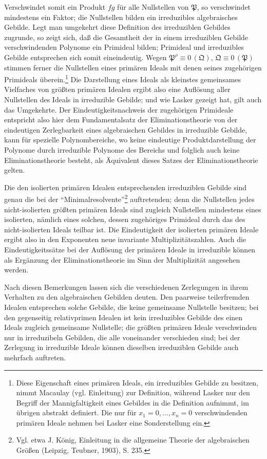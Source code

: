 \documentclass[11pt]{article}
\newcommand{\ideal}[1]{\mathfrak{#1}}
\newcommand{\eqzero}[1]{\equiv 0\,(#1)}
\begin{document}
Verschwindet somit ein Produkt $fg$ für alle Nullstellen von $\ideal P$, so verschwindet mindestens ein Faktor; die Nullstellen bilden ein irreduzibles algebraisches Gebilde. Legt man umgekehrt diese Definition des irreduziblen Gebildes zugrunde, so zeigt sich, daß die Gesamtheit der in einem irreduziblen Gebilde verschwindenden Polynome ein Primideal bilden; Primideal und irreduzibles Gebilde entsprechen sich somit eineindeutig. Wegen $\ideal P^\rho\eqzero{\ideal Q}$, $\ideal Q\eqzero{\ideal P}$ stimmen ferner die Nullstellen eines primären Ideals mit denen seines zugehörigen Primideals überein.\footnote{Diese Eigenschaft eines primären Ideals, ein irreduzibles Gebilde zu besitzen, nimmt Macaulay (vgl. Einleitung) zur Definition, während Lasker nur den Begriff der Mannigfaltigkeit eines Gebildes in die Definition aufnimmt, im übrigen abstrakt definiert. Die nur für $x_1=0,
\ldots,x_n=0$ verschwindenden primären Ideale nehmen bei Lasker eine Sonderstellung ein.} Die Darstellung eines Ideals als kleinstes gemeinsames Vielfaches von größten primären Idealen ergibt also eine Auflösung aller Nullstellen des Ideals in irreduzible Gebilde; und wie Lasker gezeigt hat, gilt auch das Umgekehrte. Der Eindeutigkeitsnachweis der zugehörigen Primideale entspricht also hier dem Fundamentalsatz der Eliminationstheorie von der eindeutigen Zerlegbarkeit eines algebraischen Gebildes in irreduzible Gebilde, kann für spezielle Polynombereiche, wo keine eindeutige Produktdarstellung der Polynome durch irreduzible Polynome des Bereichs und folglich auch keine Eliminationstheorie besteht, als Äquivalent dieses Satzes der Eliminationstheorie gelten.

Die den isolierten primären Idealen entsprechenden irreduziblen Gebilde sind genau die bei der ``Minimalresolvente''\footnote{Vgl. etwa J. König, Einleitung in die allgemeine Theorie der algebraischen Größen (Leipzig, Teubner, 1903), S. 235.} auftretenden; denn die Nullstellen jedes nicht-isolierten größten primären Ideals sind zugleich Nullstellen mindestens eines isolierten, nämlich eines solchen, dessen zugehöriges Primideal durch das des nicht-isolierten Ideals teilbar ist. Die Eindeutigkeit der isolierten primären Ideale ergibt also in den Exponenten neue invariante Multiplizitätszahlen. Auch die Eindeutigkeitssätze bei der Auflösung der primären Ideale in irreduzible können als Ergänzung der Eliminationstheorie im Sinn der Multiplizität angesehen werden.

Nach diesen Bemerkungen lassen sich die verschiedenen Zerlegungen in ihrem Verhalten zu den algebraischen Gebilden deuten. Den paarweise teilerfremden Idealen entsprechen solche Gebilde, die keine gemeinsame Nullstelle besitzen; bei den gegenseitig relativprimen Idealen ist kein irreduzibles Gebilde des einen Ideals zugleich gemeinsame Nullstelle; die größten primären Ideale verschwinden nur in irreduzibeln Gebilden, die alle voneinander verschieden sind; bei der Zerlegung in irreduzible Ideale können dieselben irreduziblen Gebilde auch mehrfach auftreten.
\end{document}
